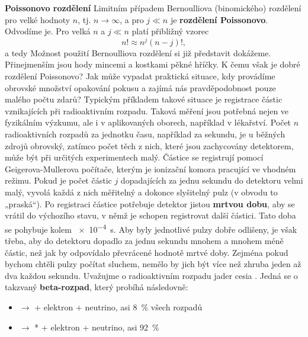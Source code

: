 \begin{mdframed}[style=mdexam]
  \begin{example}\label{mai:exam068}
    \textbf{Poissonovo rozdělení}\newline
    Limitním případem Bernoulliova (binomického) rozdělení pro velké hodnoty \(n\), tj. \(n
    \rightarrow \infty\), a pro \(j \ll n\) je \textbf{rozdělení Poissonovo}. Odvodíme je. Pro velká
    \(n\) a \(j \ll n\) platí přibližný vzorec
    \begin{equation*}
      n! \approx n^j(n-j)!,
    \end{equation*}
    a tedy   Možnost použití Bernoulliova rozdělení si již představit dokážeme. Přinejmenším jsou
    hody mincemi a kostkami pěkné hříčky. K čemu však je dobré rozdělení Poissonovo? Jak může
    vypadat praktická situace, kdy provádíme obrovské množství opakování pokusu a zajímá nás
    pravděpodobnost pouze malého počtu zdarů? Typickým příkladem takové situace je registrace částic
    vznikajících při radioaktivním rozpadu. Taková měření jsou potřebná nejen ve fyzikálním výzkumu,
    ale i v aplikovaných oborech, například v lékařství. Počet \(n\) radioaktivních rozpadů za
    jednotku času, například za sekundu, je u běžných zdrojů obrovský, zatímco počet těch z nich,
    které jsou zachycovány detektorem, může být při určitých experimentech malý. Částice se
    registrují pomocí Geigerova-Mullerova počítače, kterým je ionizační komora pracující ve vhodném
    režimu. Pokud je počet částic \(j\) dopadajících za jednu sekundu do detektoru velmi malý,
    vyvolá každá z nich měřitelný a dokonce slyšitelný pulz (v obvodu to „praská“). Po registraci
    částice potřebuje detektor jistou \textbf{mrtvou dobu}, aby se vrátil do výchozího stavu, v němž
    je schopen registrovat další částici. Tato doba se pohybuje kolem \SI{e-4}{s}. Aby byly
    jednotlivé pulzy dobře odlišeny, je však třeba, aby do detektoru dopadlo za jednu sekundu mnohem
    a mnohem méně částic, než jak by odpovídalo převrácené hodnotě mrtvé doby. Zejména pokud bychom
    chtěli pulzy počítat sluchem, nemělo by jich být více než zhruba jeden až dva každou sekundu.
    Uvažujme o radioaktivním rozpadu jader cesia . Jedná se o takzvaný
    \textbf{beta-rozpad}, který probíhá následovně:
    \begin{itemize}
      \item {} \(\longrightarrow\)  + elektron + neutrino, asi \SI{8}{\percent} 
            všech rozpadů
      \item {} \(\longrightarrow\) * + elektron + neutrino, asi \SI{92}{\percent} 

\end{itemize}
\end{example}
\end{mdframed}
